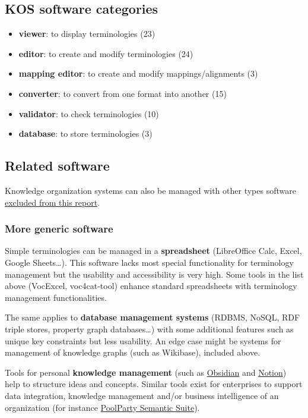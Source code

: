 \documentclass[
  DIV=10]{article}
\providecommand{\tightlist}{%
  \setlength{\itemsep}{0pt}\setlength{\parskip}{0pt}}
\begin{document}
\subsection{KOS software categories}\label{kos-software-categories}

\begin{itemize}
\tightlist
\item
  \textbf{viewer}: to display terminologies (23)
\item
  \textbf{editor}: to create and modify terminologies (24)
\item
  \textbf{mapping editor}: to create and modify mappings/alignments (3)
\item
  \textbf{converter}: to convert from one format into another (15)
\item
  \textbf{validator}: to check terminologies (10)
\item
  \textbf{database}: to store terminologies (3)
\end{itemize}

\subsection{Related software}\label{related-software}

Knowledge organization systems can also be managed with other types
software \hyperref[scope]{excluded from this report}.

\subsubsection{More generic software}\label{more-generic-software}

Simple terminologies can be managed in a \textbf{spreadsheet}
(LibreOffice Calc, Excel, Google Sheets\ldots). This software lacks most
special functionality for terminology management but the usability and
accessibility is very high. Some tools in the list above (VocExcel,
voc4cat-tool) enhance standard spreadsheets with terminology management
functionalities.

The same applies to \textbf{database management systems} (RDBMS, NoSQL,
RDF triple stores, property graph databases\ldots) with some additional
features such as unique key constraints but less usability. An edge case
might be systems for management of knowledge graphs (such as Wikibase),
included above.

Tools for personal \textbf{knowledge management} (such as
\href{https://obsidian.md/}{Obsidian} and
\href{https://www.notion.com/}{Notion}) help to structure ideas and
concepts. Similar tools exist for enterprises to support data
integration, knowledge management and/or business intelligence of an
organization (for instance
\href{https://www.poolparty.biz/product-overview}{PoolParty Semantic
Suite}).
\end{document}
